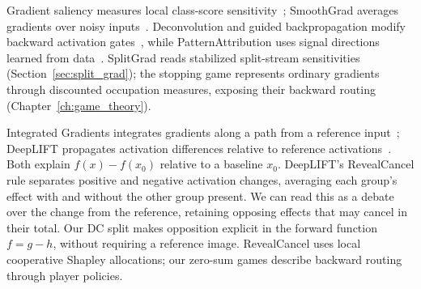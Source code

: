 Gradient saliency measures local class-score sensitivity~\parencite{Simonyan2014}; SmoothGrad averages gradients over noisy inputs~\parencite{Smilkov2017}. Deconvolution and guided backpropagation modify backward activation gates~\parencite{ZeilerFergus2014,Springenberg2015}, while PatternAttribution uses signal directions learned from data~\parencite{Kindermans2018PatternAttribution}. SplitGrad reads stabilized split-stream sensitivities (Section~\ref{sec:split_grad}); the stopping game represents ordinary gradients through discounted occupation measures, exposing their backward routing (Chapter~\ref{ch:game_theory}).

Integrated Gradients integrates gradients along a path from a reference input~\parencite{Sundararajan2017}; DeepLIFT propagates activation differences relative to reference activations~\parencite{Shrikumar2017}. Both explain $f(x)-f(x_0)$ relative to a baseline $x_0$. DeepLIFT's RevealCancel rule separates positive and negative activation changes, averaging each group's effect with and without the other group present. We can read this as a debate over the change from the reference, retaining opposing effects that may cancel in their total. Our DC split makes opposition explicit in the forward function $f=g-h$, without requiring a reference image. RevealCancel uses local cooperative Shapley allocations; our zero-sum games describe backward routing through player policies.

